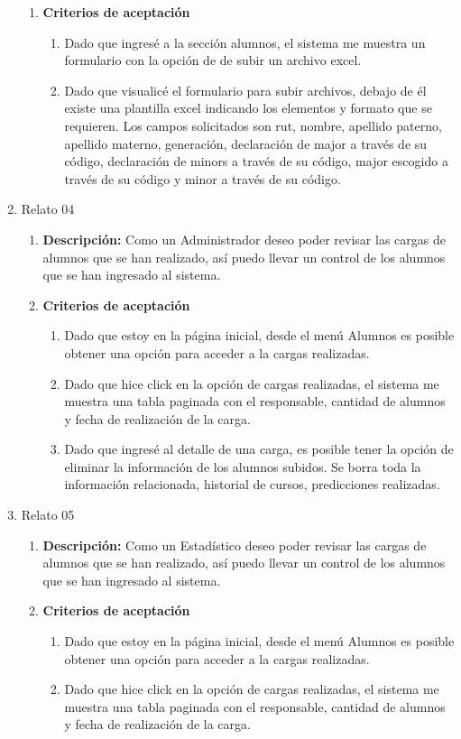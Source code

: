 \begin{enumerate}
\begin{enumerate}
			\item \textbf{Criterios de aceptación}
				\begin{enumerate}
					\item Dado que ingresé a la sección alumnos, el sistema me muestra un formulario con la opción de de subir un archivo excel.
					\item Dado que visualicé el formulario para subir archivos, debajo de él existe una plantilla excel indicando los elementos y formato que se requieren. Los campos solicitados son rut, nombre, apellido paterno, apellido materno, generación, declaración de major a través de su código, declaración de minors a través de su código, major escogido a través de su código y minor a través de su código.
				\end{enumerate}
		\end{enumerate}
	\item Relato 04
		\begin{enumerate}
			\item \textbf{Descripción:} Como un Administrador deseo poder revisar las cargas de alumnos que se han realizado, así puedo llevar un control de los alumnos que se han ingresado al sistema.
			\item \textbf{Criterios de aceptación}
				\begin{enumerate}
					\item Dado que estoy en la página inicial, desde el menú Alumnos es posible obtener una opción para acceder a la cargas realizadas.
					\item Dado que hice click en la opción de cargas realizadas, el sistema me muestra una tabla paginada con el responsable, cantidad de alumnos y fecha de realización de la carga.
					\item Dado que ingresé al detalle de una carga, es posible tener la opción de eliminar la información de los alumnos subidos. Se borra toda la información relacionada, historial de cursos, predicciones realizadas.
				\end{enumerate}
		\end{enumerate}
	\item Relato 05
		\begin{enumerate}
			\item \textbf{Descripción:} Como un Estadístico deseo poder revisar las cargas de alumnos que se han realizado, así puedo llevar un control de los alumnos que se han ingresado al sistema.
			\item \textbf{Criterios de aceptación}
				\begin{enumerate}
					\item Dado que estoy en la página inicial, desde el menú Alumnos es posible obtener una opción para acceder a la cargas realizadas.
					\item Dado que hice click en la opción de cargas realizadas, el sistema me muestra una tabla paginada con el responsable, cantidad de alumnos y fecha de realización de la carga.
				\end{enumerate}
		\end{enumerate}
\end{enumerate}

